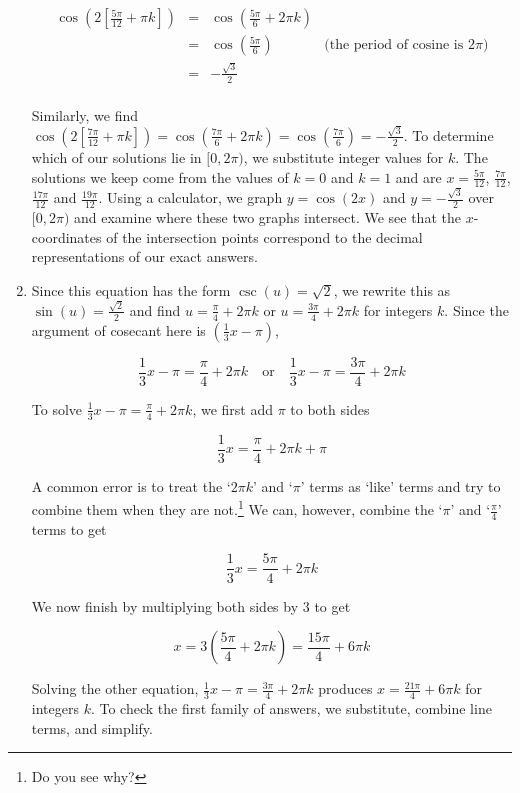 \begin{ex}
\begin{enumerate}
\[\begin{array}{rclr}
\cos\left( 2\left[\frac{5\pi}{12} + \pi k\right]\right) &  = &  \cos\left(\frac{5\pi}{6} + 2\pi k\right) & \\ [3pt]
																												& =  &   \cos\left(\frac{5\pi}{6}\right) & \text{(the period of cosine is $2\pi$)} \\ [3pt]
																												& =  & -\frac{\sqrt{3}}{2} & \\
\end{array}\] 

Similarly, we find $\cos\left( 2\left[\frac{7\pi}{12} + \pi k\right]\right) = \cos\left(\frac{7\pi}{6} + 2\pi k\right) = \cos\left(\frac{7\pi}{6}\right) = -\frac{\sqrt{3}}{2}$.  To determine which of our solutions lie in $[0,2\pi)$, we substitute integer values for $k$.  The solutions we keep come from the values of $k = 0$ and $k =1$ and are  $x = \frac{5\pi}{12}$,  $\frac{7\pi}{12}$, $\frac{17\pi}{12}$ and $\frac{19\pi}{12}$.  Using a calculator, we graph $y = \cos(2x)$ and $y = -\frac{\sqrt{3}}{2}$ over $[0,2\pi)$ and examine where these two graphs intersect.  We see that the $x$-coordinates of the intersection points correspond to the decimal representations of our exact answers.

\item  Since this equation has the form $\csc(u) = \sqrt{2}$, we rewrite this as $\sin(u) = \frac{\sqrt{2}}{2}$ and find $u = \frac{\pi}{4} + 2\pi k$ or $u = \frac{3\pi}{4} + 2\pi  k$ for integers $k$.  Since the argument of cosecant here is $\left(\frac{1}{3}x-\pi \right)$,

\[ \frac{1}{3}x-\pi = \frac{\pi}{4} + 2\pi k \quad \text{or} \quad  \frac{1}{3}x-\pi = \frac{3\pi}{4} + 2\pi k\]


To solve $\frac{1}{3}x-\pi = \frac{\pi}{4} + 2\pi k$, we first add $\pi$ to both sides

\[ \frac{1}{3} x = \frac{\pi}{4} + 2\pi k + \pi\]

A common error is to treat the `$2\pi k$' and `$\pi$' terms as `like' terms and try to combine them when they are not.\footnote{Do you see why?}  We can, however, combine the `$\pi$' and `$\frac{\pi}{4}$' terms to get

\[ \frac{1}{3} x = \frac{5\pi}{4} + 2\pi k\]

We now finish by multiplying both sides by $3$ to get

\[ x = 3 \left( \frac{5\pi}{4} + 2\pi k \right) = \frac{15 \pi}{4} + 6\pi k \]

Solving the other equation, $\frac{1}{3}x-\pi = \frac{3\pi}{4} + 2\pi k$ produces $x = \frac{21\pi}{4} + 6 \pi k$ for integers $k$. To check the first family of answers, we substitute, combine line terms, and simplify.


\end{enumerate}
\end{ex}
